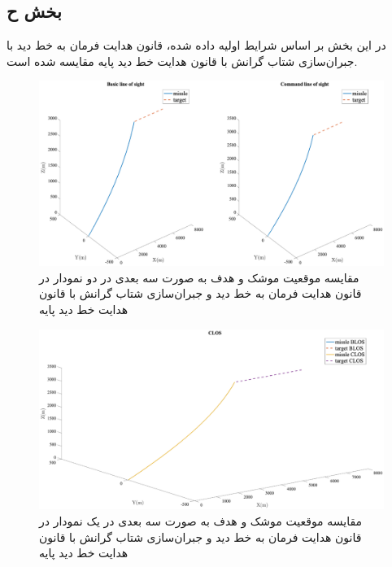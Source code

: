 \subsection{بخش ح}
در این بخش بر اساس شرایط اولیه داده شده،  قانون هدایت فرمان به خط دید با جبران‌سازی شتاب گرانش با قانون هدایت خط دید پایه مقایسه شده است.

\begin{figure}[H]
	\centering
	\includegraphics[width=\linewidth]{../Figure/h/3DoF_missle_vs_target_state}
	\caption{مقایسه موقعیت موشک و هدف به صورت سه بعدی در دو نمودار در قانون هدایت فرمان به خط دید و جبران‌سازی شتاب گرانش با قانون هدایت خط دید پایه }
\end{figure}

\begin{figure}[H]
	\centering
	\includegraphics[width=\linewidth]{../Figure/h/3DoF_missle_vs_target_state_all_in}
	\caption{مقایسه موقعیت موشک و هدف به صورت سه بعدی در یک نمودار در قانون هدایت فرمان به خط دید و جبران‌سازی شتاب گرانش با قانون هدایت خط دید پایه }
\end{figure}

